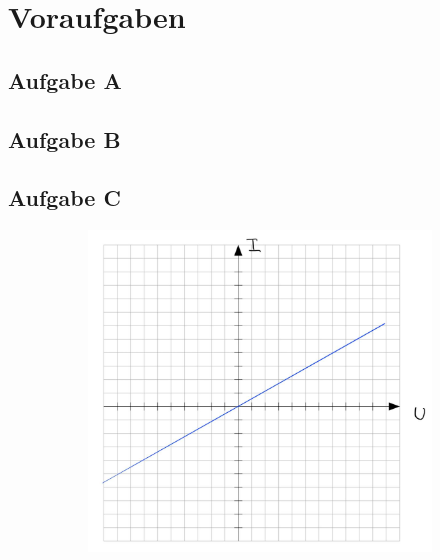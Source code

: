\chapter{Voraufgaben}

\section*{Aufgabe A}
\section*{Aufgabe B}
\section*{Aufgabe C}
\begin{figure}[H]
    \centering
    \begin{subfigure}[b]{0.45\textwidth}
        \includegraphics[width=\textwidth]{figs/Voraufgaben/Ca.jpg}
        \caption{}
        \label{fig:VA_C_a}
    \end{subfigure}
    \hfill
    \begin{subfigure}[b]{0.45\textwidth}

\end{subfigure}
\end{figure}
